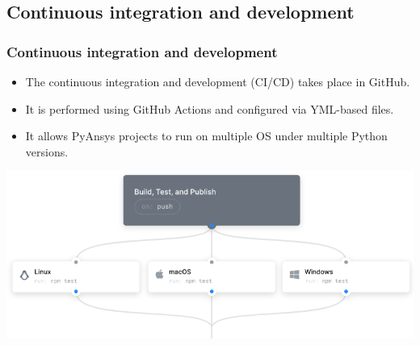 \documentclass[t]{beamer}
\begin{document}
\subsection{Continuous integration and development}
\begin{frame}[fragile=singleslide]
  \frametitle{Continuous integration and development}

   \begin{itemize}
        \item The continuous integration and development (CI/CD) takes place in GitHub.
        \item It is performed using GitHub Actions and configured via YML-based files.
        \item It allows PyAnsys projects to run on multiple OS under multiple Python versions.
   \end{itemize}

  \centering
  \includegraphics[height=.5\textheight]{./figures/gh_actions_pipeline.png}

\end{frame}


\end{document}
